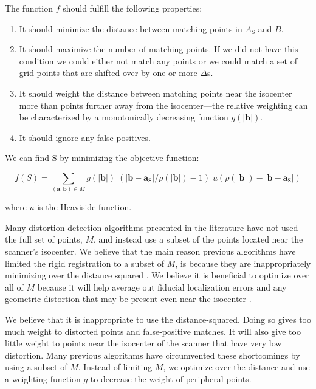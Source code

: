 \documentclass[12pt]{article}
\begin{document}
The function $f$ should fulfill the following properties:

\begin{enumerate}
\item It should minimize the distance between matching points in $A_\mathrm{S}$ and $B$.
\item It should maximize the number of matching points.  If we did not have this condition we could either not match any points or we could match a set of grid points that are shifted over by one or more $\Delta$s.
\item It should weight the distance between matching points near the isocenter more than points further away from the isocenter---the relative weighting can be characterized by a monotonically decreasing function $g(|\mathbf{b}|)$.
\item It should ignore any false positives.
\end{enumerate}

We can find $\mathrm{S}$ by minimizing the objective function:

$$
f(S) =
\sum_{(\textbf{a}, \textbf{b}) \in M} g(\left|\mathbf{b}\right|)
\;
(\left|\mathbf{b} - \mathbf{a}_\textrm{S}\right|/\rho(|\mathbf{b}|) - 1)
\;
u(\rho(|\mathbf{b}|) - \left|\mathbf{b} - \mathbf{a}_\textrm{S}\right|)
$$

where $u$ is the Heaviside function.

Many distortion detection algorithms presented in the literature have not used the full set of points, $M$, and instead use a subset of the points located near the scanner's isocenter.  We believe that the main reason previous algorithms have limited the rigid registration to a subset of $M$, is because they are inappropriately minimizing over the distance squared \cite{wang2005}.  We believe it is beneficial to optimize over all of $M$ because it will help average out fiducial localization errors and any geometric distortion that may be present even near the isocenter \cite{baldwin2007}.

We believe that it is inappropriate to use the distance-squared.  Doing so gives too much weight to distorted points and false-positive matches.  It will also give too little weight to points near the isocenter of the scanner that have very low distortion.  Many previous algorithms have circumvented these shortcomings by using a subset of $M$.  Instead of limiting $M$, we optimize over the distance and use a weighting function $g$ to decrease the weight of peripheral points.
\end{document}
